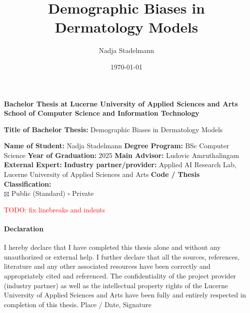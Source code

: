 \documentclass[a4paper,10.5pt,
			   bindingoffset=0.2in,left=3.35cm,right=2.12cm,top=3.75cm,bottom=2.88cm,%
				footskip=.25in
				listof=numbered,toc=chapterentrywithdots]{scrreport}
\title{Demographic Biases in Dermatology Models}
\author{Nadja Stadelmann}
\date{\today}
\renewcommand{\todo}[1]{\textcolor{red}{TODO: #1}}
\begin{document}
	\maketitle
	
	
	\fontsize{12}{14}
	\noindent\textbf{Bachelor Thesis at Lucerne University of Applied Sciences and Arts
		School of Computer Science and Information Technology} \\ \vspace*{0.6cm}
	
	\fontsize{10.5}{12}
	\noindent
	\textbf{Title of Bachelor Thesis:} Demographic Biases in Dermatology Models\\ \vspace*{0.2cm}
	
	\noindent
	\textbf{Name of Student:} Nadja Stadelmann\newline \newline
	\textbf{Degree Program:} BSc Computer Science \newline \newline
	\textbf{Year of Graduation:} 2025\newline \newline
	\textbf{Main Advisor:} Ludovic Amruthalingam\newline \newline
	\textbf{External Expert:} \newline \newline
	\textbf{Industry partner/provider:} Applied AI Research Lab, Lucerne University of Applied Sciences and Arts\newline \newline \newline
	\textbf{Code / Thesis Classification:}\\
	$\boxtimes$ Public (Standard) \newline
	$\square$ Private
	
	
	\todo{fix linebreaks and indents}
	\paragraph{\textbf{Declaration}}
	I hereby declare that I have completed this thesis alone and without any unauthorized or external help. I further declare that all the sources, references, literature and any other associated resources have been correctly and appropriately cited and referenced. The confidentiality of the project provider (industry partner) as well as the intellectual property rights of the Lucerne University of Applied Sciences and Arts have been fully and entirely respected in completion of this thesis. \newline \newline
	Place / Date, Signature	\underline{\hspace*{8cm}} \newline \newline
	
\end{document}

